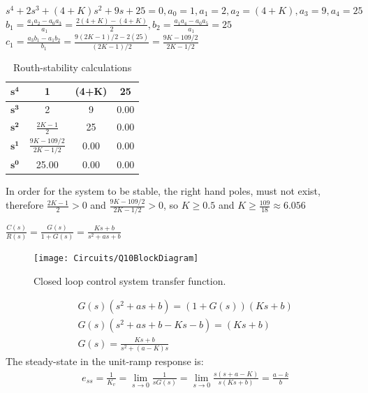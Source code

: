 \documentclass[12pt]{article}
\newenvironment{problem}[2][Problem]{\begin{trivlist}
		\item[\hskip \labelsep {\bfseries #1}\hskip \labelsep {\bfseries #2.}]}{\end{trivlist}}
\begin{document}
\begin{problem}{9 --- B-5-21 --- Routh stability criterion} \hfill\newline
$s^4 + 2s^3 + (4 + K)s^2 + 9s + 25 = 0, a_0=1, a_1=2,a_2=(4+K),a_3=9,a_4=25$ \newline
$ \displaystyle b_1 =\frac{a_1a_2-a_0a_3}{a_1}= \frac{2(4+K)-(4+K)}{2}, b_2=\frac{a_1a_4-a_0a_5}{a_1}=25$  \newline $\displaystyle c_1 =\frac{a_3b_1-a_1b_2}{b_1}=\frac{9(2K-1)/2-2(25)}{(2K-1)/2}=\frac{9K-109/2}{2K-1/2}$
\begin{table}[H]
	\centering
		\renewcommand*{\arraystretch}{2}
\begin{tabular}{l c c c}
		\hline
		$\mathbf{s^4}$&1&(4+K)&25\\\hline
			$\mathbf{s^3}$&2&9&0.00\\\hline
		$\mathbf{s^2}$&$\frac{2K-1}{2}$&25&0.00\\\hline
			$\mathbf{s^1}$&$\frac{9K-109/2}{2K-1/2}$&0.00&0.00\\\hline
			$\mathbf{s^0}$&25.00&0.00&0.00\\\hline
	\end{tabular}
	\caption{Routh-stability calculations}
\end{table}
In order for the system to be stable, the right hand poles, must not exist, therefore $\frac{2K-1}{2} > 0$ and $\frac{9K-109/2}{2K-1/2}>0$, so $K \geq 0.5$ and $\displaystyle \boxed{ K \geq \frac{109}{18} \approx 6.056}$
\end{problem}
\begin{problem}{10 --- B-5-26 --- open loop transfer function-} \hfill\newline
	$\displaystyle \frac{C(s)}{R(s)}=\frac{G(s)}{1+G(s)}=\frac{Ks+b}{s^2+as+b}$
\begin{figure}[H]
	\centering
	\texttt{[image: Circuits/Q10BlockDiagram]}
	\caption{Closed loop control system transfer function.}
	\label{fig:q10blockdiagram}
\end{figure}
	\begin{align*}
		& G(s)(s^2+as+b)=(1+G(s))(Ks+b) \\
		& G(s)(s^2+as+b-Ks-b)=(Ks+b) \\
		& G(s)=\frac{Ks+b}{s^2+(a-K)s}
	\end{align*}
	The steady-state in the unit-ramp response is:
	\begin{align*}
		& e_{ss}=\frac{1}{K_v}	= \lim\limits_{s \rightarrow 0}\frac{1}{sG(s)}= \lim\limits_{s \rightarrow 0}\frac{s(s+a-K)}{s(Ks+b)}=\frac{a-k}{b}
	\end{align*}
\end{problem}
\end{document}
